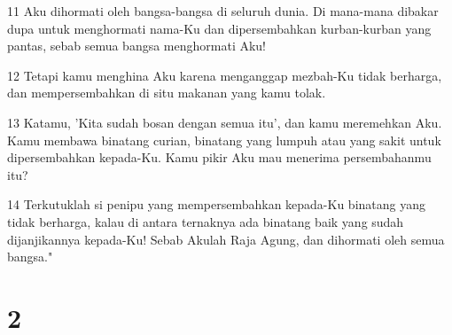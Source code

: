 \par 11 Aku dihormati oleh bangsa-bangsa di seluruh dunia. Di mana-mana dibakar dupa untuk menghormati nama-Ku dan dipersembahkan kurban-kurban yang pantas, sebab semua bangsa menghormati Aku!
\par 12 Tetapi kamu menghina Aku karena menganggap mezbah-Ku tidak berharga, dan mempersembahkan di situ makanan yang kamu tolak.
\par 13 Katamu, 'Kita sudah bosan dengan semua itu', dan kamu meremehkan Aku. Kamu membawa binatang curian, binatang yang lumpuh atau yang sakit untuk dipersembahkan kepada-Ku. Kamu pikir Aku mau menerima persembahanmu itu?
\par 14 Terkutuklah si penipu yang mempersembahkan kepada-Ku binatang yang tidak berharga, kalau di antara ternaknya ada binatang baik yang sudah dijanjikannya kepada-Ku! Sebab Akulah Raja Agung, dan dihormati oleh semua bangsa."

\chapter{2}

